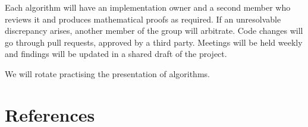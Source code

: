 Each algorithm will have an implementation owner and a second member who reviews it and produces mathematical proofs as required. If an unresolvable discrepancy arises, another member of the group will arbitrate.
Code changes will go through pull requests, approved by a third party. Meetings will be held weekly and findings will be updated in a shared draft of the project.

We will rotate practising the presentation of algorithms. 




\clearpage

\section{References}








